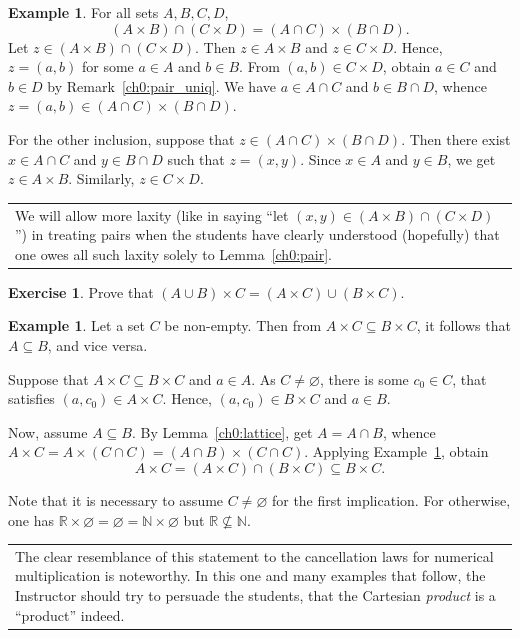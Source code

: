 \documentclass[12pt,notitlepage]{article}
\theoremstyle{plain}
\theoremstyle{definition}
\newtheorem{exc}[thm]{Exercise}
\newtheorem{exm}[thm]{Example}
\theoremstyle{plain}
\newcommand{\N}{\mathbb{N}}
\newcommand{\R}{\mathbb{R}}
\newcommand{\sbs}{\subseteq}
\newcommand{\void}{\varnothing}
\newcommand{\1}{\mathbf{1}}
\newcommand{\0}{\mathbf{0}}
\newcommand{\mcomm}[1]{
\medskip\noindent\begin{tabular}{| l}
\parbox{0.99\textwidth}{{\small
#1 }}\end{tabular}
\smallskip}
\begin{document}
\begin{exm}\label{ch0:exm32}
For all sets $A, B, C, D$, 
$$(A \times B) \cap (C \times D) = (A \cap C) \times (B \cap D).$$
Let $z \in (A \times B) \cap (C \times D)$. Then $z \in A \times B$ and $z \in C \times D$.  Hence, $z = (a,b)$ for some $a \in A$ and $b\in B$. From $(a,b) \in C \times D$, obtain $a \in C$ and $b \in D$ by Remark~\ref{ch0:pair_uniq}. We have $a \in A \cap C$ and $b \in B \cap D$, whence $z = (a, b) \in (A \cap C) \times (B \cap D)$.

For the other inclusion, suppose that $z \in (A \cap C) \times (B \cap D)$. Then there exist $x \in A \cap C$ and $y \in B \cap D$ such that $z = (x, y)$. Since $x \in A$ and $y \in B$, we get $z \in A \times B$. Similarly, $z \in C \times D$.
\end{exm}
\mcomm{We will allow more laxity (like in saying ``let $(x, y) \in (A \times B) \cap (C \times D)$'') in treating pairs when the students have clearly understood (hopefully) that one owes all such laxity solely to Lemma~\ref{ch0:pair}.}

\begin{exc}
Prove that
$(A \cup B) \times C = (A \times C) \cup (B \times C).$
\end{exc}

\begin{exm}\label{ch0:exm34}
Let a set $C$ be non-empty. Then from $A \times C \sbs B \times C$, it follows that $A \sbs B$, and vice versa.

Suppose that $A \times C \sbs B \times C$ and $a \in A$. As $C \neq \void$, there is some $c_0 \in C$, that satisfies $(a,c_0) \in A \times C$. Hence, $(a,c_0) \in B \times C$ and $a \in B$.

Now, assume $A \sbs B$. By Lemma~\ref{ch0:lattice}, get $A = A \cap B$, whence $A \times C = A \times (C \cap C) = (A \cap B) \times (C \cap C)$. Applying Example~\ref{ch0:exm32}, obtain
$$A \times C = (A \times C) \cap (B \times C) \sbs B \times C.$$
\end{exm}
Note that it is necessary to assume $C \neq \void$ for the first implication. For otherwise, one has $\R \times \void = \void = \N \times \void$ but $\R \not\sbs \N$.

\mcomm{The clear resemblance of this statement to the cancellation laws for numerical multiplication is noteworthy. In this one and many examples that follow, the Instructor should try to persuade the students, that the Cartesian \emph{product} is a ``product'' indeed.}
\end{document}
